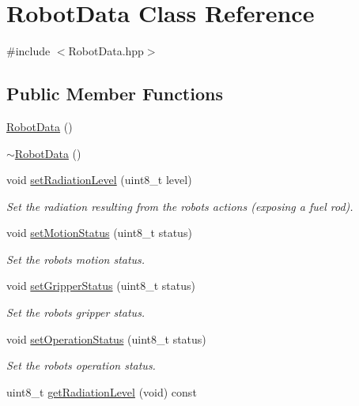 \hypertarget{class_robot_data}{}\section{Robot\+Data Class Reference}
\label{class_robot_data}


{\ttfamily \#include $<$Robot\+Data.\+hpp$>$}

\subsection*{Public Member Functions}
\begin{DoxyCompactItemize}
\item 
\hyperlink{class_robot_data_a0007f4b014a950d356d2d63156b572af}{Robot\+Data} ()
\item 
\hyperlink{class_robot_data_a1a285ab1dcfea6980f86536b5c2a3c0f}{$\sim$\+Robot\+Data} ()
\item 
void \hyperlink{class_robot_data_a330b0e4fa0303df4a16b8c07e917c622}{set\+Radiation\+Level} (uint8\+\_\+t level)
\begin{DoxyCompactList}\small\item\em Set the radiation resulting from the robots actions (exposing a fuel rod). \end{DoxyCompactList}\item 
void \hyperlink{class_robot_data_a72b1b729501cd7a0620e83c5d4d9a714}{set\+Motion\+Status} (uint8\+\_\+t status)
\begin{DoxyCompactList}\small\item\em Set the robot\textquotesingle{}s motion status. \end{DoxyCompactList}\item 
void \hyperlink{class_robot_data_aa115713d34966f38642357eba5543f16}{set\+Gripper\+Status} (uint8\+\_\+t status)
\begin{DoxyCompactList}\small\item\em Set the robot\textquotesingle{}s gripper status. \end{DoxyCompactList}\item 
void \hyperlink{class_robot_data_a2676bf89bd178c2a9a38236d936a49c0}{set\+Operation\+Status} (uint8\+\_\+t status)
\begin{DoxyCompactList}\small\item\em Set the robot\textquotesingle{}s operation status. \end{DoxyCompactList}\item 
uint8\+\_\+t \hyperlink{class_robot_data_a8bffbd345dfd74acedd44270133e0477}{get\+Radiation\+Level} (void) const

\end{DoxyCompactItemize}
